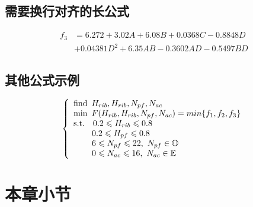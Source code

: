 \subsection{需要换行对齐的长公式}

\begin{equation}\label{eq:P}
    \begin{split}
        f_3 & = 6.272 + 3.02 A + 6.08 B + 0.0368 C - 0.8848 D  \\
            & + 0.04381 D^2 + 6.35 AB - 0.3602 AD - 0.5497 BD
    \end{split}
\end{equation}

\subsection{其他公式示例}
\begin{equation}
    \begin{aligned}
    \left\{
        \begin{array}{l}
        \text {find}\enspace H_{rib},H_{rib},N_{pf},N_{ac} \\
        \text {min} \enspace F(H_{rib},H_{rib},N_{pf},N_{ac})= min\{f_1,f_2,f_3\} \\

            \text{s.t.\enspace}\enspace 0.2 \leqslant H_{rib} \leqslant 0.8    \\
            \hspace{2.2em} 0.2 \leqslant H_{pf} \leqslant 0.8                     \\
            \hspace{2.2em} 6 \leqslant N_{pf} \leqslant 22,\ N_{pf}\in \mathbb{O} \\
            \hspace{2.2em} 0 \leqslant N_{ac} \leqslant 16,\ N_{ac}\in \mathbb{E}
        \end{array}
    \right. 
    \end{aligned}
    \label{eq:MO}
\end{equation}

\section{本章小节}